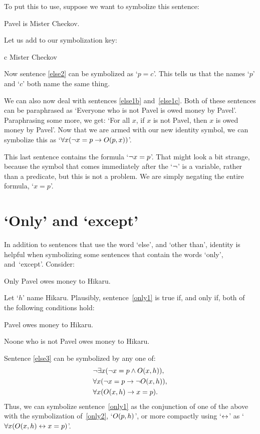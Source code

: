 To put this to use, suppose we want to symbolize this sentence:
\begin{earg}
\item[\ex{else2}] Pavel is Mister Checkov.
\end{earg}
Let us add to our symbolization key:
	\begin{ekey}
		\item[c] Mister Checkov
	\end{ekey}
Now sentence \ref{else2} can be symbolized as `$p=c$'. This tells us that the names `$p$' and `$c$' both name the same thing.

We can also now deal with sentences \ref{else1b} and~\ref{else1c}. Both of these sentences can be  paraphrased as `Everyone who is not Pavel is owed money by Pavel'. Paraphrasing some more, we get: `For all $x$, if $x$ is not Pavel, then $x$ is owed money by Pavel'. Now that we are armed with our new identity symbol, we can symbolize this as `$\forall x (\neg x = p \rightarrow \mathord{O}(p,x))$'.

This last sentence contains the formula `$\neg x = p$'. That might look a bit strange, because the symbol that comes immediately after the `$\neg$' is a variable, rather than a predicate, but this is not a problem. We are simply negating the entire formula, `$x = p$'. 

\section{`Only' and `except'}

In addition to sentences that use the word `else', and `other than', identity is helpful when symbolizing some sentences that contain the words `only', and~`except'. Consider:
\begin{earg}
\item[\ex{only1}] Only Pavel owes money to Hikaru.
\end{earg}
Let `$h$' name Hikaru. Plausibly, sentence~\ref{only1} is true if, and only if, both of the following conditions hold:
\begin{earg}
	\item[\ex{only2}] Pavel owes money to Hikaru.
	\item[\ex{else3}] Noone who is not Pavel owes money to Hikaru.
\end{earg}
Sentence \ref{else3} can be symbolized by any one of:
\begin{align*}
	& \neg\exists x(\neg x = p \wedge \mathord{O}(x,h)),\\
	& \forall x(\neg x = p \rightarrow \neg\mathord{O}(x,h)),\\
	& \forall x(\mathord{O}(x,h) \rightarrow x = p).
\end{align*}
Thus, we can symbolize sentence~\ref{only1} as the conjunction of one of the above with the symbolization of~\ref{only2}, `$\mathord{O}(p,h)$', or more compactly using `$\leftrightarrow$' as `$\forall x(\mathord{O}(x,h) \leftrightarrow x = p)$'.


